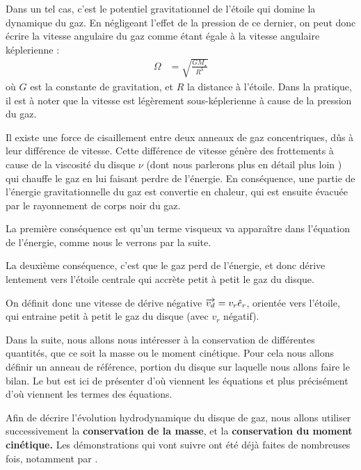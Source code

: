 Dans un tel cas, c'est le potentiel gravitationnel de l'étoile qui domine la dynamique du gaz. En négligeant l'effet de la pression de ce dernier, on peut donc écrire la vitesse angulaire du gaz comme étant égale à la vitesse angulaire képlerienne : 
\begin{align}
\Omega &= \sqrt{\frac{GM_\star}{R^3}}
\end{align}
où $G$ est la constante de gravitation, et $R$ la distance à l'étoile. Dans la pratique, il est à noter que la vitesse est légèrement sous-képlerienne à cause de la pression du gaz. 

\bigskip

Il existe une force de cisaillement entre deux anneaux de gaz concentriques, dûs à leur différence de vitesse. Cette différence de vitesse génère des frottements à cause de la viscosité du disque $\nu$ (dont nous parlerons plus en détail plus loin ) qui chauffe le gaz en lui faisant perdre de l'énergie. En conséquence, une partie de l'énergie gravitationnelle du gaz est convertie en chaleur, qui est ensuite évacuée par le rayonnement de corps noir du gaz. 

\bigskip

La première conséquence est qu'un terme visqueux va apparaître dans l'équation de l'énergie, comme nous le verrons par la suite. 

La deuxième conséquence, c'est que le gaz perd de l'énergie, et donc dérive lentement vers l'étoile centrale qui accrète petit à petit le gaz du disque. 

On définit donc une vitesse de dérive négative ${\overrightarrow{v_d}} = v_r \hat{e}_r$, orientée vers l'étoile, qui entraine petit à petit le gaz du disque (avec $v_r$ négatif).

Dans la suite, nous allons nous intéresser à la conservation de différentes quantités, que ce soit la masse ou le moment cinétique. Pour cela nous allons définir un anneau de référence, portion du disque sur laquelle nous allons faire le bilan. Le but est ici de présenter d'où viennent les équations et plus précisément d'où viennent les termes des équations. 

\bigskip

Afin de décrire l'évolution hydrodynamique du disque de gaz, nous allons utiliser successivement la \textbf{conservation de la masse}, et la \textbf{conservation du moment cinétique.} Les démonstrations qui vont suivre ont été déjà faites de nombreuses fois, notamment par \citep{pringle1981accretion}.

